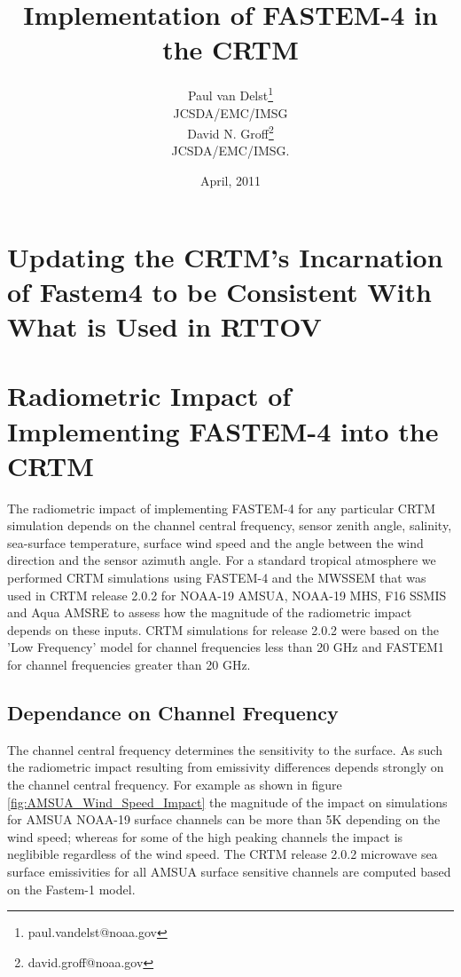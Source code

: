

%

\title{Implementation of FASTEM-4 in the CRTM}
\author{Paul van Delst\footnote{paul.vandelst@noaa.gov}\\JCSDA/EMC/IMSG\\[0.25in]
        David N. Groff\footnote{david.groff@noaa.gov}\\JCSDA/EMC/IMSG.}
\date{April, 2011}


\maketitle


\section{Updating the CRTM's Incarnation of Fastem4 to be Consistent With What is Used in RTTOV}


\section{Radiometric Impact of Implementing FASTEM-4 into the CRTM}
The radiometric impact of implementing FASTEM-4 for any particular CRTM simulation depends on the channel central frequency, sensor zenith angle, salinity, sea-surface temperature, surface wind speed and the angle between the wind direction and the sensor azimuth angle.  For a standard tropical atmosphere we performed CRTM simulations using FASTEM-4 and the MWSSEM that was used in CRTM release 2.0.2 for NOAA-19 AMSUA, NOAA-19 MHS, F16 SSMIS and Aqua AMSRE to assess how the magnitude of the radiometric impact depends on these inputs.  CRTM simulations for release 2.0.2 were based on the 'Low Frequency' model for channel frequencies less than 20 GHz and FASTEM1 for channel frequencies greater than 20 GHz. 

\subsection{Dependance on Channel Frequency}
The channel central frequency determines the sensitivity to the surface.  As such the radiometric impact resulting from emissivity differences depends strongly on the channel central frequency.  For example as shown in figure \ref{fig:AMSUA_Wind_Speed_Impact} the magnitude of the impact on simulations for AMSUA NOAA-19 surface channels can be more than 5K depending on the wind speed; whereas for some of the high peaking channels the impact is neglibible regardless of the wind speed.  The CRTM release 2.0.2 microwave sea surface emissivities for all AMSUA surface sensitive channels are computed based on the Fastem-1 model.

